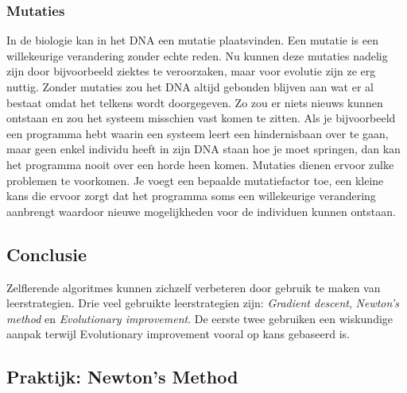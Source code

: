\subsubsection{Mutaties}
In de biologie kan in het DNA een mutatie plaatsvinden. Een mutatie is een willekeurige verandering zonder echte reden. Nu kunnen deze mutaties nadelig zijn door bijvoorbeeld ziektes te veroorzaken, maar voor evolutie zijn ze erg nuttig. Zonder mutaties zou het DNA altijd gebonden blijven aan wat er al bestaat omdat het telkens wordt doorgegeven. Zo zou er niets nieuws kunnen ontstaan en zou het systeem misschien vast komen te zitten. Als je bijvoorbeeld een programma hebt waarin een systeem leert een hindernisbaan over te gaan, maar geen enkel individu heeft in zijn DNA staan hoe je moet springen, dan kan het programma nooit over een horde heen komen. Mutaties dienen ervoor zulke problemen te voorkomen. Je voegt een bepaalde mutatiefactor toe, een kleine kans die ervoor zorgt dat het programma soms een willekeurige verandering aanbrengt waardoor nieuwe mogelijkheden voor de individuen kunnen ontstaan.

\subsection{Conclusie}
Zelflerende algoritmes kunnen zichzelf verbeteren door gebruik te maken van leerstrategien. Drie veel gebruikte leerstrategien zijn: \textit{Gradient descent}, \textit{Newton's method} en \textit{Evolutionary improvement}. De eerste twee gebruiken een wiskundige aanpak  terwijl Evolutionary improvement vooral op kans gebaseerd is.

\textcolor{praktijk}{
\subsection{Praktijk: Newton's Method}
}